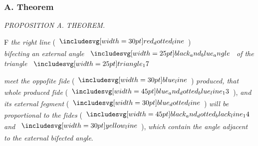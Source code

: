 \documentclass[11pt,preview]{standalone}
\begin{document}
\subsubsection{A. Theorem}

\begin{minipage}[t]{0.43\textwidth}
    \vspace{20pt}
    
\end{minipage}%
\hfill
\begin{minipage}[t]{0.54\textwidth}
    \begin{center}
        \textit{PROPOSITION A. THEOREM.}\label{book6prA} \\
    \end{center}

    \hfill

    \begin{center}
        \raggedright \lettrine[lines=3, loversize=1, nindent=0pt]{}{}F \textit{the right line} (\hspace{-1ex}$\dottedredline$\hspace{-1ex})\\ \textit{biſecting an external angle} $\img{black_and_blue_angle}$ \textit{of the triangle} $\img{triangle_17}$
    \end{center}
    \raggedright \textit{meet the oppoſite ſide} (\hspace{-1ex}$\blueline$\hspace{-1ex}) \textit{produced, that whole produced ſide} (\hspace{-1ex}$\bimg{blue_and_dotted_blue_line_13}$\hspace{-1ex}), \textit{and its external ſegment} (\hspace{-1ex}$\dottedblueline$\hspace{-1ex}) \textit{will be proportional to the ſides} (\hspace{-1ex}$\bimg{black_and_dotted_black_line_14}$ \textit{and} $\yellowline$\hspace{-1ex}), \textit{which contain the angle adjacent to the external biſected angle}.
\end{minipage}%

\hfill
\end{document}
